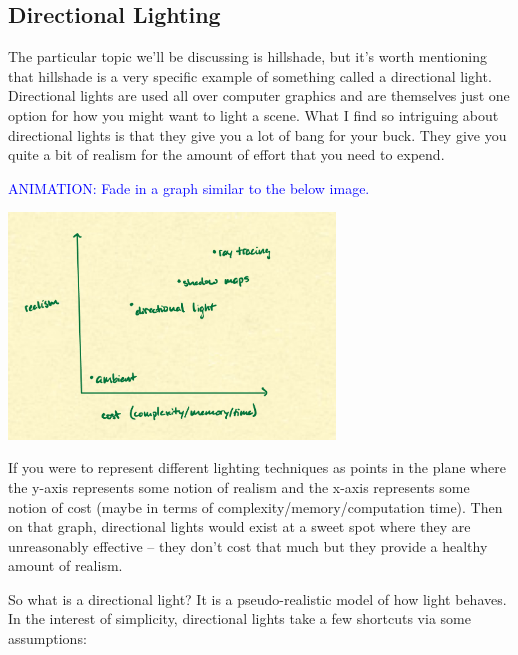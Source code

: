 \documentclass{article}
\newcommand\animation[1]{\textcolor{blue}{ANIMATION: #1}}
\begin{document}
\subsection{Directional Lighting}

The particular topic we'll be discussing is hillshade, but it's worth mentioning that hillshade is a very specific example of something called a directional light.
Directional lights are used all over computer graphics and are themselves just one option for how you might want to light a scene.
What I find so intriguing about directional lights is that they give you a lot of bang for your buck.
They give you quite a bit of realism for the amount of effort that you need to expend.

\animation{Fade in a graph similar to the below image.}

\begin{center}
	\includegraphics[width=0.65\textwidth,frame]{assets/realism.jpg}
\end{center}

If you were to represent different lighting techniques as points in the plane where the y-axis represents some notion of realism and the x-axis represents some notion of cost (maybe in terms of complexity/memory/computation time).
Then on that graph, directional lights would exist at a sweet spot where they are unreasonably effective -- they don't cost that much but they provide a healthy amount of realism.

So what is a directional light?
It is a pseudo-realistic model of how light behaves.
In the interest of simplicity, directional lights take a few shortcuts via some assumptions:
\end{document}
